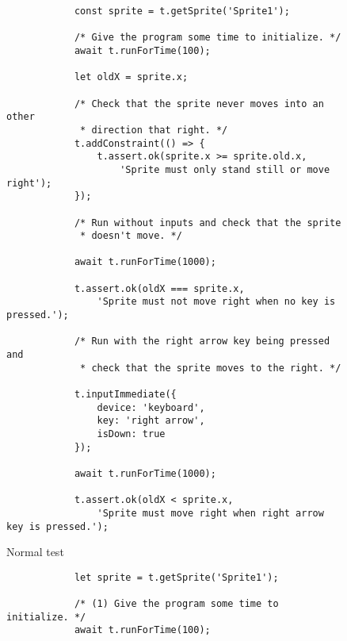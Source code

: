 \begin{listing}[htpb]
    \centering
    \begin{subfigure}[b]{.40\textwidth}
        \centering
        \begin{verbatim}
            const sprite = t.getSprite('Sprite1');

            /* Give the program some time to initialize. */
            await t.runForTime(100);

            let oldX = sprite.x;

            /* Check that the sprite never moves into an other
             * direction that right. */
            t.addConstraint(() => {
                t.assert.ok(sprite.x >= sprite.old.x,
                    'Sprite must only stand still or move right');
            });

            /* Run without inputs and check that the sprite
             * doesn't move. */

            await t.runForTime(1000);

            t.assert.ok(oldX === sprite.x,
                'Sprite must not move right when no key is pressed.');

            /* Run with the right arrow key being pressed and
             * check that the sprite moves to the right. */

            t.inputImmediate({
                device: 'keyboard',
                key: 'right arrow',
                isDown: true
            });

            await t.runForTime(1000);

            t.assert.ok(oldX < sprite.x,
                'Sprite must move right when right arrow key is pressed.');
        \end{verbatim}
        \vspace{-\bigskipamount}
        \caption{Normal test}
    \end{subfigure}
    \hspace{.08\textwidth}
    \begin{subfigure}[b]{.50\textwidth}
        \centering
        \begin{verbatim}
            let sprite = t.getSprite('Sprite1');

            /* (1) Give the program some time to initialize. */
            await t.runForTime(100);


\end{verbatim}
\end{subfigure}
\end{listing}
